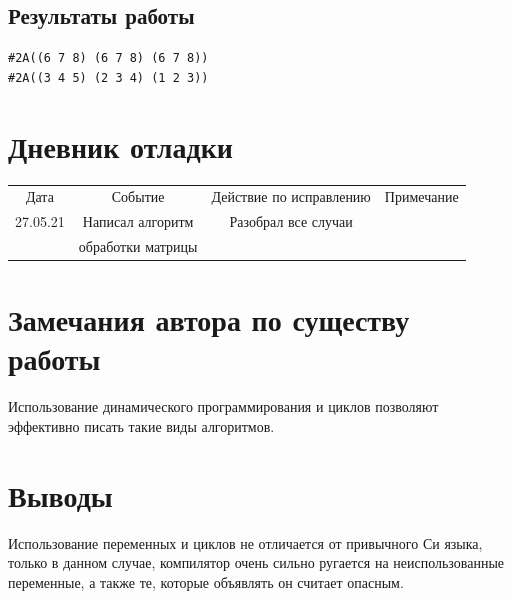 \documentclass[15pt]{extarticle}
\begin{document}
\subsection{Результаты работы}

\begin{lstlisting}
#2A((6 7 8) (6 7 8) (6 7 8)) 
#2A((3 4 5) (2 3 4) (1 2 3))
\end{lstlisting}

\section{Дневник отладки}

\begin{tabular}{|c|c|c|c|}
\hline
Дата     & Событие              & Действие по исправлению   & Примечание \\
27.05.21 & Написал алгоритм    & Разобрал все случаи &            \\
         & обработки матрицы &                           &            \\
\hline
\end{tabular}

\section{Замечания автора по существу работы}
Использование динамического программирования и циклов позволяют эффективно писать такие виды алгоритмов.

\section{Выводы}
Использование переменных и циклов не отличается от привычного Си языка, только в данном случае, компилятор очень сильно ругается на неиспользованные переменные, а также те, которые объявлять он считает опасным.
\end{document}
